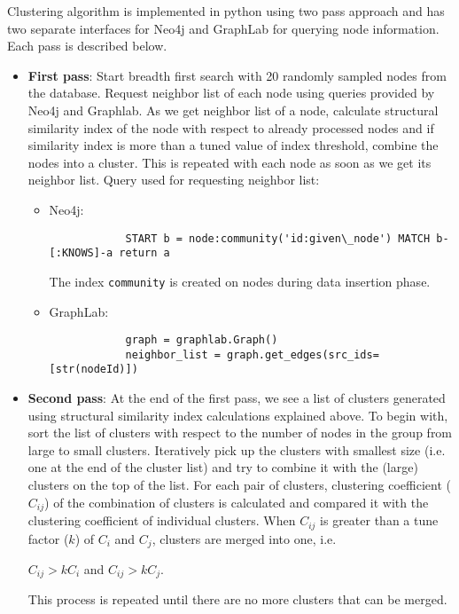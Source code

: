 Clustering algorithm is implemented in python using two pass approach and has two separate interfaces for Neo4j and GraphLab for querying node information. Each pass is described below.
\begin{itemize}
	\item
	\textbf{First pass}: Start breadth first search with 20 randomly sampled nodes from the database. Request neighbor list of each node using queries provided by Neo4j and Graphlab. As we get neighbor list of a node, calculate structural similarity index of the node with respect to already processed nodes and if similarity index is more than a tuned value of index threshold, combine the nodes into a cluster. This is repeated with each node as soon as we get its neighbor list. Query used for requesting neighbor list:
		\begin{itemize}
			\item
			Neo4j:
			\begin{verbatim}
			START b = node:community('id:given\_node') MATCH b-[:KNOWS]-a return a
			\end{verbatim}
			The index \texttt{community} is created on nodes during data insertion phase.
			\item
			GraphLab: 
			\begin{verbatim}
			graph = graphlab.Graph()
			neighbor_list = graph.get_edges(src_ids=[str(nodeId)])
			\end{verbatim}
		\end{itemize}
	\item
	\textbf{Second pass}: At the end of the first pass, we see a list of clusters generated using structural similarity index calculations explained above. To begin with, sort the list of clusters with respect to the number of nodes in the group from large to small clusters. Iteratively pick up the clusters with smallest size (i.e. one at the end of the cluster list) and try to combine it with the (large) clusters on the top of the list. For each pair of clusters, clustering coefficient ($ C_{ij} $) of the combination of clusters is calculated and compared it with the clustering coefficient of individual clusters. When $ C_{ij} $ is greater than a tune factor ($ k $) of $ C_i $ and $ C_j $, clusters are merged into one, i.e. 
	\begin{center}
		$ C_{ij} > kC_i$ and $C_{ij} > kC_j $.
	\end{center} 
	This process is repeated until there are no more clusters that can be merged.
\end{itemize}
